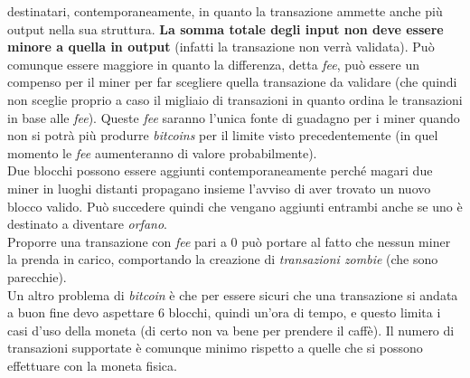 \documentclass[a4paper,12pt, oneside]{book}
\begin{document}
destinatari, contemporaneamente, in quanto la transazione ammette anche più
output nella sua struttura. \textbf{La somma totale degli input non deve essere
  minore a quella in output} (infatti la transazione non verrà validata). Può
comunque essere maggiore in quanto la differenza, detta \textit{fee}, può essere
un compenso per il miner per far scegliere quella transazione da validare (che
quindi non sceglie proprio a caso il migliaio di transazioni in quanto ordina le
transazioni in base alle \textit{fee}). Queste \textit{fee} saranno l'unica
fonte di guadagno per i miner quando non si potrà più produrre \textit{bitcoins}
per il limite visto precedentemente (in quel momento le \textit{fee}
aumenteranno di valore probabilmente).\\
Due blocchi possono essere aggiunti contemporaneamente perché magari due miner
in luoghi distanti propagano insieme l'avviso di aver trovato un nuovo blocco
valido. Può succedere quindi che vengano aggiunti entrambi anche se uno è
destinato a diventare \textit{orfano}.\\
Proporre una transazione con \textit{fee} pari a 0 può portare al fatto che
nessun miner la prenda in carico, comportando la creazione di
\textit{transazioni zombie} (che sono parecchie).\\
Un altro problema di \textit{bitcoin} è che per essere sicuri che una
transazione si andata a buon fine devo aspettare 6 blocchi, quindi un'ora di
tempo, e questo limita i casi d'uso della moneta (di certo non va bene per
prendere il caffè). Il numero di transazioni supportate è comunque minimo
rispetto a quelle che si possono effettuare con la moneta fisica.
\end{document}
